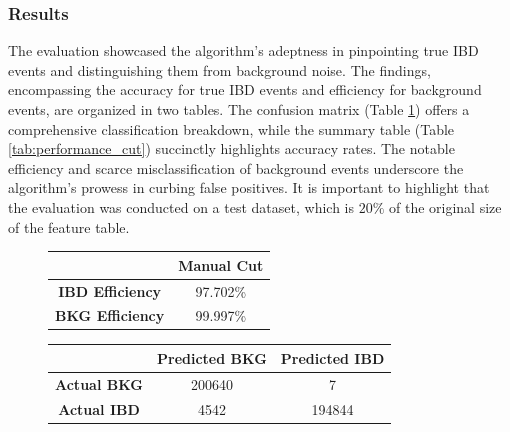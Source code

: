 \vspace{-1cm}

\subsubsection{Results}
The evaluation showcased the algorithm's adeptness in pinpointing true IBD events and distinguishing them from background noise. The findings, encompassing the accuracy for true IBD events and efficiency for background events, are organized in two tables. The confusion matrix (Table \ref{tab:confusion_matrix_cut}) offers a comprehensive classification breakdown, while the summary table (Table \ref{tab:performance_cut}) succinctly highlights accuracy rates. The notable efficiency and scarce misclassification of background events underscore the algorithm's prowess in curbing false positives. It is important to highlight that the evaluation was conducted on a test dataset, which is $20\%$ of the original size of the feature table.



\begin{figure}[h!]
	\centering
	\small
	\hspace{-4cm}
	\begin{minipage}{0.3\textwidth}
		\begin{tabular}{cc}
			\toprule
			 & \textbf{Manual Cut} \\ 
			\midrule
			\textbf{IBD Efficiency} &  97.702\% \\ 
			\textbf{BKG Efficiency} &  99.997\% \\ 
			\bottomrule
		\end{tabular}
		\label{tab:performance_cut}
	\end{minipage}
\hspace{1.5cm}
	\begin{minipage}{0.5\textwidth}
		\centering
		\begin{tabular}{ccc}
			\toprule
			& \textbf{Predicted BKG} & \textbf{Predicted IBD} \\
			\midrule
			\textbf{Actual BKG} & 200640 & 7 \\
			\textbf{Actual IBD} & 4542 & 194844 \\
			\bottomrule
		\end{tabular}
	\label{tab:confusion_matrix_cut}
	\end{minipage}
	\hspace{-2cm}
\end{figure}

